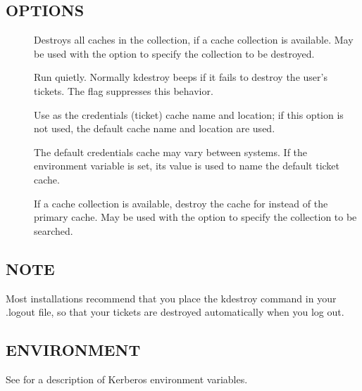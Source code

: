 \documentclass[letterpaper,10pt,english]{sphinxmanual}
\begin{document}
\subsection{OPTIONS}
\label{\detokenize{user/user_commands/kdestroy:options}}\begin{description}
\item[{}] \leavevmode
Destroys all caches in the collection, if a cache collection is
available.  May be used with the  option to specify the
collection to be destroyed.

\item[{}] \leavevmode
Run quietly.  Normally kdestroy beeps if it fails to destroy the
user’s tickets.  The  flag suppresses this behavior.

\item[{ }] \leavevmode
Use  as the credentials (ticket) cache name and
location; if this option is not used, the default cache name and
location are used.

The default credentials cache may vary between systems.  If the
 environment variable is set, its value is used to
name the default ticket cache.

\item[{ }] \leavevmode
If a cache collection is available, destroy the cache for
 instead of the primary cache.  May be used with the
 option to specify the collection to be searched.

\end{description}


\subsection{NOTE}
\label{\detokenize{user/user_commands/kdestroy:note}}
Most installations recommend that you place the kdestroy command in
your .logout file, so that your tickets are destroyed automatically
when you log out.


\subsection{ENVIRONMENT}
\label{\detokenize{user/user_commands/kdestroy:environment}}
See {\hyperref[\detokenize{user/user_config/kerberos:kerberos-7}]{}} for a description of Kerberos environment
variables.
\end{document}
